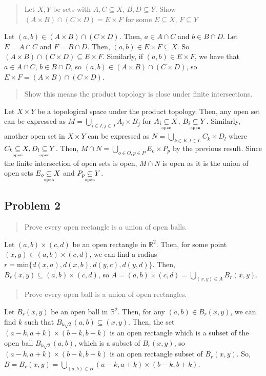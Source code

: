 \documentclass[8pt]{extarticle}
\newcommand{\open}{\underset{\clap{\tiny open}}{\subseteq}}
\begin{document}
{\begin{quote}
	Let $X,Y$ be sets with $A,C\subseteq X$, $B,D\subseteq Y$. Show $(A\times B)\cap (C\times D) = E\times F$ for some $E\subseteq X$, $F\subseteq Y$
\end{quote}
Let $(a,b)\in (A\times B)\cap(C\times D)$. Then, $a\in A\cap C$ and $b\in B\cap D$. Let $E = A\cap C$ and $F = B\cap D$. Then, $(a,b)\in E\times F\subseteq X$. So $(A\times B)\cap (C\times D) \subseteq E\times F$. Similarly, if $(a,b)\in E\times F$, we have that $a\in A\cap C$, $b\in B\cap D$, so $(a,b)\in (A\times B)\cap(C\times D)$, so $E\times F = (A\times B)\cap(C\times D)$.
\begin{quote}
	Show this means the product topology is close under finite intersections.
\end{quote}
Let $X\times Y$ be a topological space under the product topology. Then, any open set can be expressed as $M = \bigcup_{i\in I, j\in J} A_{i}\times B_{j}$ for $A_{i}\open X$, $B_{i}\open Y$. Similarly, another open set in $X\times Y$ can be expressed as $N = \bigcup_{k\in K, l\in L}C_{k}\times D_{l}$ where $C_{k}\open X,D_{l}\open Y$. Then, $M\cap N = \bigcup_{o\in O, p\in P}E_{o}\times P_{p}$ by the previous result. Since the finite intersection of open sets is open, $M\cap N$ is open as it is the union of open sets $E_{o}\open X$ and $P_{p}\open Y$.
\subsection*{Problem 2}%

\begin{quote}
	Prove every open rectangle is a union of open balls.
\end{quote}
Let $(a,b)\times (c,d)$ be an open rectangle in $\mathbb{R}^2$. Then, for some point $(x,y)\in (a,b)\times (c,d)$, we can find a radius $r = \textrm{min}\{d(x,a),d(x,b),d(y,c),d(y,d)\}$. Then, $B_{r}(x,y)\subseteq (a,b)\times (c,d)$, so $A = (a,b)\times(c,d) = \bigcup_{(x,y)\in A} B_{r}(x,y)$.
\begin{quote}
	Prove every open ball is a union of open rectangles.
\end{quote}
Let $B_{r}(x,y)$ be an open ball in $\mathbb{R}^2$. Then, for any $(a,b)\in B_{r}(x,y)$, we can find $k$ such that $B_{k\sqrt 2}(a,b)\subseteq (x,y)$. Then, the set $(a-k,a+k)\times (b-k,b+k)$ is an open rectangle which is a subset of the open ball $B_{k\sqrt 2}(a,b)$, which is a subset of $B_{r}(x,y)$, so $(a-k,a+k)\times(b-k,b+k)$ is an open rectangle subset of $B_{r}(x,y)$. So, $B = B_{r}(x,y) = \bigcup_{(a,b)\in B}(a-k,a+k)\times(b-k,b+k)$.
}
\end{document}
